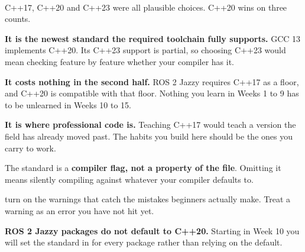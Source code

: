 \documentclass[
    10pt,
    dvipsnames,
    svgnames,
    x11names,
    aspectratio=1610,
    english,
    codeminted]{beamer}
\begin{document}
\begin{frame}[fragile]{\secname}
\framesubtitle{\subsecname}
C++17, C++20 and C++23 were all plausible choices. C++20 wins on three counts.

\begin{compactitem}
\small
    \item \textbf{It is the newest standard the required toolchain fully supports.} GCC 13 implements C++20. Its C++23 support is partial, so choosing C++23 would mean checking feature by feature whether your compiler has it.
    \item \textbf{It costs nothing in the second half.} ROS 2 Jazzy requires C++17 as a floor, and C++20 is compatible with that floor. Nothing you learn in Weeks 1 to 9 has to be unlearned in Weeks 10 to 15.
    \item \textbf{It is where professional code is.} Teaching C++17 would teach a version the field has already moved past. The habits you build here should be the ones you carry to work.
\end{compactitem}

\medskip
{}

\begin{compactitem}
\small
    \item The standard is a \textbf{compiler flag, not a property of the file}. Omitting it means silently compiling against whatever your compiler defaults to.
    \item {} turn on the warnings that catch the mistakes beginners actually make. Treat a warning as an error you have not hit yet.
\end{compactitem}

\medskip
\begin{MyBox}
\textbf{ROS 2 Jazzy packages do not default to C++20.} Starting in Week 10 you will set the standard in  for every package rather than relying on the default.
\end{MyBox}
\end{frame}

\end{document}
